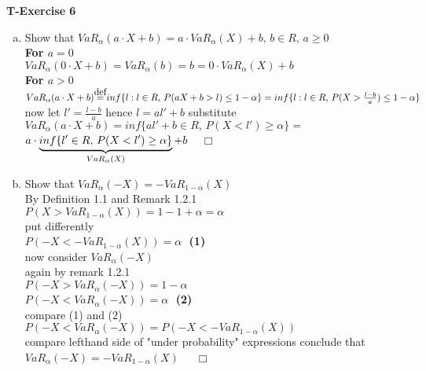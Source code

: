 \documentclass[11pt]{article}
\newcommand\myeq{\stackrel{\mathclap{\normalfont\mbox{def}}}{=}}
\begin{document}
\noindent
\textbf{T-Exercise 6}
	\begin{enumerate}[(a)] %
		\item Show that $VaR_{\alpha}(a \cdot X + b) = a \cdot VaR_{\alpha}(X) + b, \, b \in R, \, a \geq 0$
		\\[5pt] \textbf{For $a=0$}
		\\[5pt] $VaR_{\alpha}(0 \cdot X + b) = VaR_{\alpha}(b)=b=0 \cdot VaR_{\alpha}(X) + b $ 
		\\[8pt] \textbf{For $a>0$}
		\\[3pt] $VaR_{\alpha}(a \cdot X + b) \myeq inf\{ l:l \in R, \, P(aX+b > l) \leq 1-\alpha \} = 
		\\[5pt]inf\{ l:l \in R, \, P(X > \frac{l-b}{a}) \leq 1-\alpha \}$
		\\[5pt] now let $l'=\frac{l-b}{a}$ hence $l=al'+b$ substitute
		\\[5pt] $VaR_{\alpha}(a \cdot X + b) = inf\{ al'+b \in R, \, P(X < l') \geq \alpha \} =$
		\\[7pt] $a \cdot \underbrace{ inf\{ l' \in R, \, P(X < l') \geq \alpha \} }_\text{$ VaR_{\alpha}(X) $} + b$ $\,\,\,\,\, \Box$
			
		\item Show that $VaR_{\alpha}(-X)=-VaR_{1-\alpha}(X)$
		\\[5pt] By Definition 1.1 and Remark 1.2.1
		\\[5pt] $P(X>VaR_{1-\alpha}(X))=1-1+\alpha=\alpha$
		\\[5pt] put differently 
		\\[5pt] $P(-X<-VaR_{1-\alpha}(X))=\alpha \,\,$ \textbf{ (1)}
		\\[8pt] now consider $VaR_{\alpha}(-X)$
		\\[5pt] again by remark 1.2.1
		\\[5pt] $P(-X>VaR_{\alpha}(-X))=1-\alpha$
		\\[5pt] $P(-X<VaR_{\alpha}(-X))=\alpha \,\,$ \textbf{ (2)}
		\\[5pt] compare (1) and (2)
		\\[5pt] $P(-X<VaR_{\alpha}(-X))=P(-X<-VaR_{1-\alpha}(X))$
		\\[5pt] compare lefthand side of "under probability" expressions conclude that
		\\[5pt] $VaR_{\alpha}(-X)=-VaR_{1-\alpha}(X) \,\,$  $\,\,\,\,\, \Box$
	
	\end{enumerate}
\end{document}
